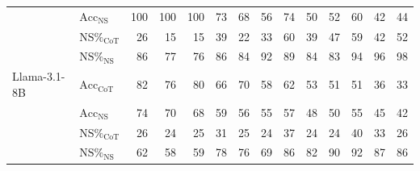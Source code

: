 \begin{table}[t]
\begin{tabular}{ll|rrr|rrr|rrr|rrr}
     & $\text{Acc}_{\text{NS}}$ & 100 & 100 & 100 & 73 & 68 & 56 & 74 & 50 & 52 & 60 & 42 & 44 \\
     & $\text{NS\%}_{\text{CoT}}$ & 26 & 15 & 15 & 39 & 22 & 33 & 60 & 39 & 47 & 59 & 42 & 52 \\
     & $\text{NS\%}_{\text{NS}}$ & 86 & 77 & 76 & 86 & 84 & 92 & 89 & 84 & 83 & 94 & 96 & 98 \\
    \midrule
    Llama-3.1-8B & $\text{Acc}_{\text{CoT}}$ & 82 & 76 & 80 & 66 & 70 & 58 & 62 & 53 & 51 & 51 & 36 & 33 \\
     & $\text{Acc}_{\text{NS}}$ & 74 & 70 & 68 & 59 & 56 & 55 & 57 & 48 & 50 & 55 & 45 & 42 \\
     & $\text{NS\%}_{\text{CoT}}$ & 26 & 24 & 25 & 31 & 25 & 24 & 37 & 24 & 24 & 40 & 33 & 26 \\
     & $\text{NS\%}_{\text{NS}}$ & 62 & 58 & 59 & 78 & 76 & 69 & 86 & 82 & 90 & 92 & 87 & 86 \\
    \bottomrule
  \end{tabular}
\end{table}
